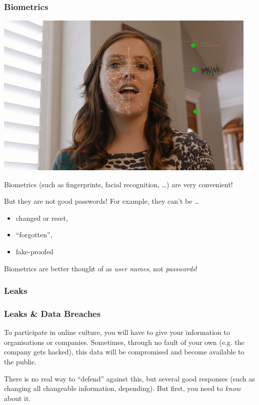 \documentclass[aspectratio=1610,dvipsnames]{beamer}
\begin{document}
\begin{frame}
\frametitle{Biometrics}

\begin{minipage}{0.5\textwidth}
\begin{center}
\includegraphics[width=0.95\textwidth, keepaspectratio]{images/hirevue.jpeg}
\end{center}
\end{minipage}\quad
\begin{minipage}{0.45\textwidth}
Biometrics (such as fingerprints, facial recognition, \dots) are very convenient!
\medskip

But they are not good passwords! For example, they can't be \dots

\begin{itemize}
\pause\item changed or reset,
\pause\item ``forgotten'',
\pause\item fake-proofed
\end{itemize}
\end{minipage}

\pause\bigskip
\begin{center}
\Large
Biometrics are better thought of as \emph{user names}, not \emph{passwords}!
\end{center}
\end{frame}

\subsubsection{Leaks}

\begin{frame}
\frametitle{Leaks \& Data Breaches}

To participate in online culture, you will have to give your information to organisations or companies. Sometimes, through no fault of your own (e.g. the company gets hacked), this data will be compromised and become available to the public.
\pause\bigskip

There is no real way to ``defend'' against this, but several good responses (such as changing all changeable information, depending). But first, you need to \emph{know} about it.
\end{frame}
\end{document}
